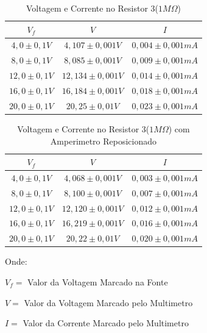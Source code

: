 \documentclass[article]{abntex2}
\begin{document}
\begin{table}[htb]
\begin{center}
\caption{Voltagem e Corrente no Resistor 3($1M\Omega$)}
\begin{tabular}{ |c|c|c| }
        \hline
        $V_f$ &$V$ &$I$ \\
        \hline
        $4,0 \pm 0,1V$ &$4,107 \pm 0,001V$ &$0,004 \pm 0,001mA$ \\
        \hline
        $8,0 \pm 0,1V$ &$8,085 \pm 0,001V$ &$0,009 \pm 0,001mA$ \\
        \hline
        $12,0 \pm 0,1V$ &$12,134 \pm 0,001V$ &$0,014 \pm 0,001mA$ \\
        \hline
        $16,0 \pm 0,1V$ &$16,184 \pm 0,001V$ &$0,018 \pm 0,001mA$ \\
        \hline
        $20,0 \pm 0,1V$ &$20,25 \pm 0,01V$ &$0,023 \pm 0,001mA$ \\
        \hline
\end{tabular}
\end{center}
\end{table}
\begin{table}[htb]
\begin{center}
\caption{Voltagem e Corrente no Resistor 3($1M\Omega$) com Amperimetro Reposicionado}
\begin{tabular}{ |c|c|c| }
            \hline
            $V_f$ &$V$ &$I$ \\
            \hline
            $4,0 \pm 0,1V$ &$4,068 \pm 0,001V$ &$0,003 \pm 0,001mA$ \\
            \hline
            $8,0 \pm 0,1V$ &$8,100 \pm 0,001V$ &$0,007 \pm 0,001mA$ \\
            \hline
            $12,0 \pm 0,1V$ &$12,120 \pm 0,001V$ &$0,012 \pm 0,001mA$ \\
            \hline
            $16,0 \pm 0,1V$ &$16,219 \pm 0,001V$ &$0,016 \pm 0,001mA$ \\
            \hline
            $20,0 \pm 0,1V$ &$20,22 \pm 0,01V$ &$0,020 \pm 0,001mA$ \\
            \hline
\end{tabular}
\end{center}
\end{table}
\newpage
Onde:
\newline

$V_f =$ Valor da Voltagem Marcado na Fonte

$V =$ Valor da Voltagem Marcado pelo Multimetro

$I =$ Valor da Corrente Marcado pelo Multimetro
\newline   
\end{document}
